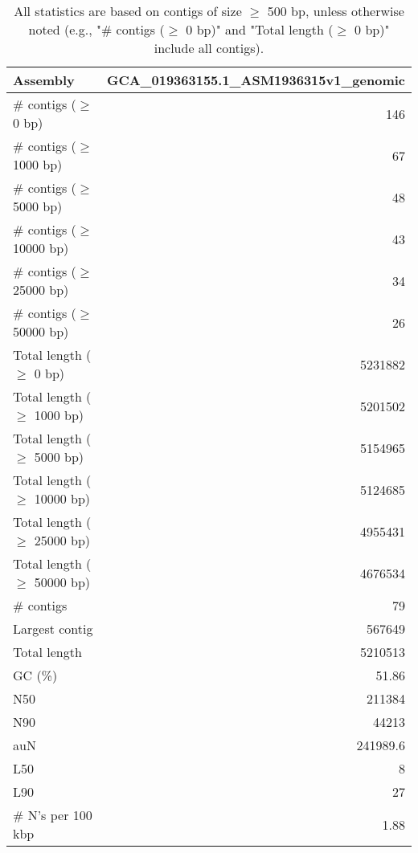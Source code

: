 \documentclass[12pt,a4paper]{article}
\begin{document}
\begin{table}[ht]
\begin{center}
\caption{All statistics are based on contigs of size $\geq$ 500 bp, unless otherwise noted (e.g., "\# contigs ($\geq$ 0 bp)" and "Total length ($\geq$ 0 bp)" include all contigs).}
\begin{tabular}{|l*{1}{|r}|}
\hline
Assembly & GCA\_019363155.1\_ASM1936315v1\_genomic \\ \hline
\# contigs ($\geq$ 0 bp) & 146 \\ \hline
\# contigs ($\geq$ 1000 bp) & 67 \\ \hline
\# contigs ($\geq$ 5000 bp) & 48 \\ \hline
\# contigs ($\geq$ 10000 bp) & 43 \\ \hline
\# contigs ($\geq$ 25000 bp) & 34 \\ \hline
\# contigs ($\geq$ 50000 bp) & 26 \\ \hline
Total length ($\geq$ 0 bp) & 5231882 \\ \hline
Total length ($\geq$ 1000 bp) & 5201502 \\ \hline
Total length ($\geq$ 5000 bp) & 5154965 \\ \hline
Total length ($\geq$ 10000 bp) & 5124685 \\ \hline
Total length ($\geq$ 25000 bp) & 4955431 \\ \hline
Total length ($\geq$ 50000 bp) & 4676534 \\ \hline
\# contigs & 79 \\ \hline
Largest contig & 567649 \\ \hline
Total length & 5210513 \\ \hline
GC (\%) & 51.86 \\ \hline
N50 & 211384 \\ \hline
N90 & 44213 \\ \hline
auN & 241989.6 \\ \hline
L50 & 8 \\ \hline
L90 & 27 \\ \hline
\# N's per 100 kbp & 1.88 \\ \hline
\end{tabular}
\end{center}
\end{table}
\end{document}
